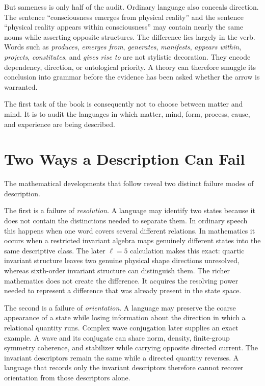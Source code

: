 But sameness is only half of the audit. Ordinary language also conceals direction. The sentence ``consciousness emerges from physical reality'' and the sentence ``physical reality appears within consciousness'' may contain nearly the same nouns while asserting opposite structures. The difference lies largely in the verb. Words such as \emph{produces}, \emph{emerges from}, \emph{generates}, \emph{manifests}, \emph{appears within}, \emph{projects}, \emph{constitutes}, and \emph{gives rise to} are not stylistic decoration. They encode dependency, direction, or ontological priority. A theory can therefore smuggle its conclusion into grammar before the evidence has been asked whether the arrow is warranted.

The first task of the book is consequently not to choose between matter and mind. It is to audit the languages in which matter, mind, form, process, cause, and experience are being described.

\section{Two Ways a Description Can Fail}

The mathematical developments that follow reveal two distinct failure modes of description.

The first is a failure of \emph{resolution}. A language may identify two states because it does not contain the distinctions needed to separate them. In ordinary speech this happens when one word covers several different relations. In mathematics it occurs when a restricted invariant algebra maps genuinely different states into the same descriptive class. The later $\ell=5$ calculation makes this exact: quartic invariant structure leaves two genuine physical shape directions unresolved, whereas sixth-order invariant structure can distinguish them. The richer mathematics does not create the difference. It acquires the resolving power needed to represent a difference that was already present in the state space.

The second is a failure of \emph{orientation}. A language may preserve the coarse appearance of a state while losing information about the direction in which a relational quantity runs. Complex wave conjugation later supplies an exact example. A wave and its conjugate can share norm, density, finite-group symmetry coherence, and stabilizer while carrying opposite directed current. The invariant descriptors remain the same while a directed quantity reverses. A language that records only the invariant descriptors therefore cannot recover orientation from those descriptors alone.

